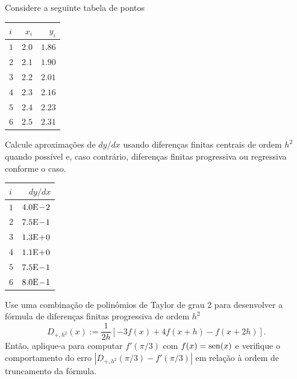 \begin{exer}\label{cap_deriv_sec_df:exer:df_tab}
  Considere a seguinte tabela de pontos
  \begin{center}
    \begin{tabular}{l|rr}
      $i$ & $x_i$ & $y_i$\\\hline
      $1$ & $2.0$ & $1.86$\\
      $2$ & $2.1$ & $1.90$\\
      $3$ & $2.2$ & $2.01$\\
      $4$ & $2.3$ & $2.16$\\
      $5$ & $2.4$ & $2.23$\\
      $6$ & $2.5$ & $2.31$\\\hline
    \end{tabular}
  \end{center}
Calcule aproximações de $dy/dx$ usando diferenças finitas centrais de ordem $h^2$ quando possível e, caso contrário, diferenças finitas progressiva ou regressiva conforme o caso.
\end{exer}
\begin{resp}
  \begin{center}
    \begin{tabular}{l|r}
      $i$ & $dy/dx$\\\hline
      $1$ & $4.0\mathrm{E}\!-\!2$\\
      $2$ & $7.5\mathrm{E}\!-\!1$\\
      $3$ & $1.3\mathrm{E}\!+\!0$\\
      $4$ & $1.1\mathrm{E}\!+\!0$\\
      $5$ & $7.5\mathrm{E}\!-\!1$\\
      $6$ & $8.0\mathrm{E}\!-\!1$\\\hline
    \end{tabular}
  \end{center}
\end{resp}

\begin{exer}
  Use uma combinação de polinômios de Taylor de grau 2 para desenvolver a fórmula de diferenças finitas progressiva de ordem $h^2$
  \begin{equation}\label{cap_deriv_sec_df:eq:dfp_h2}
    D_{+,h^2}(x) := \frac{1}{2h}\left[-3f(x) + 4f(x+h) - f(x+2h)\right].
  \end{equation}
  Então, aplique-a para computar $f'(\pi/3)$ com $f(x)=\operatorname{sen}(x)$ e verifique o comportamento do erro $|D_{+,h^2}(\pi/3) - f'(\pi/3)|$ em relação à ordem de truncamento da fórmula.
\end{exer}

